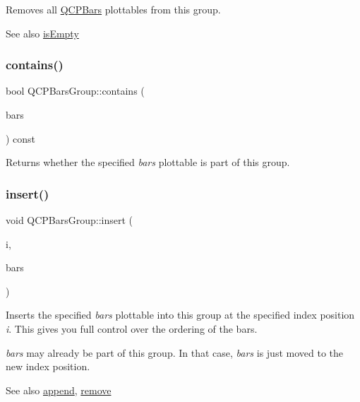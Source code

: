 Removes all \hyperlink{classQCPBars}{Q\+C\+P\+Bars} plottables from this group.

\begin{DoxySeeAlso}{See also}
\hyperlink{classQCPBarsGroup_aac959e79e852e8ef9aea6e0449ad000a}{is\+Empty} 
\end{DoxySeeAlso}
\mbox{\label{classQCPBarsGroup_ae26da07a23553052a178fb3fae90d0dc}} 
\subsubsection{\texorpdfstring{contains()}{contains()}}
{\footnotesize\ttfamily bool Q\+C\+P\+Bars\+Group\+::contains (\begin{DoxyParamCaption}\item[{\hyperlink{classQCPBars}{Q\+C\+P\+Bars} $\ast$}]{bars }\end{DoxyParamCaption}) const\hspace{0.3cm}{\ttfamily [inline]}}

Returns whether the specified {\itshape bars} plottable is part of this group. \mbox{\label{classQCPBarsGroup_a309a5f7233db189f3ea9c2d04ece6c13}} 
\subsubsection{\texorpdfstring{insert()}{insert()}}
{\footnotesize\ttfamily void Q\+C\+P\+Bars\+Group\+::insert (\begin{DoxyParamCaption}\item[{int}]{i,  }\item[{\hyperlink{classQCPBars}{Q\+C\+P\+Bars} $\ast$}]{bars }\end{DoxyParamCaption})}

Inserts the specified {\itshape bars} plottable into this group at the specified index position {\itshape i}. This gives you full control over the ordering of the bars.

{\itshape bars} may already be part of this group. In that case, {\itshape bars} is just moved to the new index position.

\begin{DoxySeeAlso}{See also}
\hyperlink{classQCPBarsGroup_a809ed63cc4ff7cd5b0b8c96b470163d3}{append}, \hyperlink{classQCPBarsGroup_a215e28a5944f1159013a0e19169220e7}{remove} 
\end{DoxySeeAlso}
\mbox{\label{classQCPBarsGroup_aac959e79e852e8ef9aea6e0449ad000a}} 
